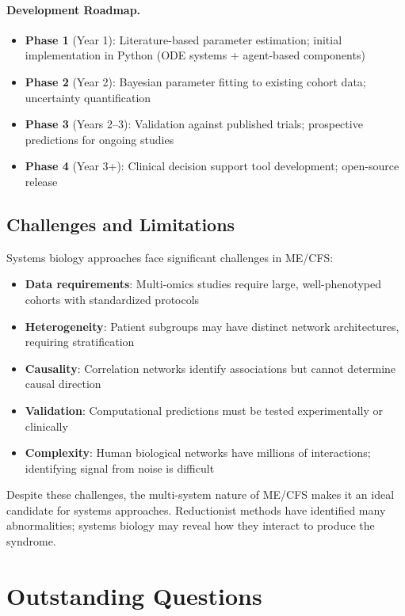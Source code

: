 \paragraph{Development Roadmap.}

\begin{itemize}
    \item \textbf{Phase 1} (Year 1): Literature-based parameter estimation; initial implementation in Python (ODE systems + agent-based components)
    \item \textbf{Phase 2} (Year 2): Bayesian parameter fitting to existing cohort data; uncertainty quantification
    \item \textbf{Phase 3} (Years 2--3): Validation against published trials; prospective predictions for ongoing studies
    \item \textbf{Phase 4} (Year 3+): Clinical decision support tool development; open-source release
\end{itemize}

\subsection{Challenges and Limitations}

Systems biology approaches face significant challenges in ME/CFS:
\begin{itemize}
    \item \textbf{Data requirements}: Multi-omics studies require large, well-phenotyped cohorts with standardized protocols
    \item \textbf{Heterogeneity}: Patient subgroups may have distinct network architectures, requiring stratification
    \item \textbf{Causality}: Correlation networks identify associations but cannot determine causal direction
    \item \textbf{Validation}: Computational predictions must be tested experimentally or clinically
    \item \textbf{Complexity}: Human biological networks have millions of interactions; identifying signal from noise is difficult
\end{itemize}

Despite these challenges, the multi-system nature of ME/CFS makes it an ideal candidate for systems approaches. Reductionist methods have identified many abnormalities; systems biology may reveal how they interact to produce the syndrome.

\section{Outstanding Questions}
\label{sec:questions}

